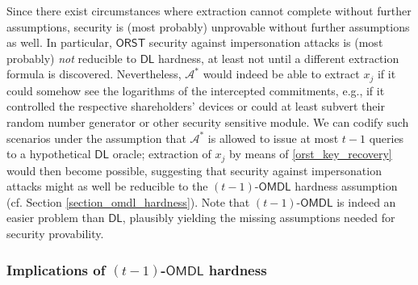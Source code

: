 \documentclass[10pt, psamsfonts, reqno]{amsart}
\theoremstyle{definition}
\theoremstyle{remark}
\numberwithin{equation}{section}
\begin{document}
Since there exist circumstances where
extraction cannot complete without further assumptions,
security is (most probably)
unprovable without further assumptions as well.
In particular,
$\mathsf{ORST}$ security
against impersonation attacks is (most probably)
\textit{not} reducible to $\mathsf{DL}$ hardness,
at least not until a different extraction formula is discovered.
Nevertheless, $\mathcal{A}^*$ would indeed be able to extract $x_j$
if it could somehow see the logarithms
of the intercepted commitments, e.g.,
if it controlled the respective shareholders' devices
or could at least subvert their random number generator
or other security sensitive module.
We can codify such scenarios under the assumption
that $\mathcal{A}^*$ is allowed to issue at most
$t-1$ queries to a hypothetical $\mathsf{DL}$ oracle;
extraction of $x_j$ by means of \eqref{orst_key_recovery}
would then become possible,
suggesting that security against impersonation attacks
might as well be reducible to the
$(t-1)$-$\mathsf{OMDL}$ hardness assumption
(cf. Section \ref{section_omdl_hardness}).
Note that $(t-1)$-$\mathsf{OMDL}$ is indeed
an easier problem than $\mathsf{DL}$,
plausibly yielding the missing assumptions needed
for security provability.


\subsubsection{Implications of $(t-1)$-$\mathsf{OMDL}$ hardness}\label{section_omdl_implications}
\end{document}
